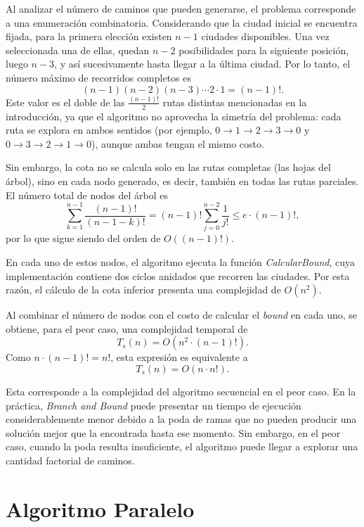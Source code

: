 \documentclass[12pt,a4paper]{article}
\begin{document}
Al analizar el número de caminos que pueden generarse, el problema corresponde a
una enumeración combinatoria. Considerando que la ciudad inicial se encuentra
fijada, para la primera elección existen $n-1$ ciudades disponibles. Una vez
seleccionada una de ellas, quedan $n-2$ posibilidades para la siguiente posición,
luego $n-3$, y así sucesivamente hasta llegar a la última ciudad. Por lo tanto, el
número máximo de recorridos completos es
\[
(n-1)(n-2)(n-3)\cdots 2 \cdot 1 = (n-1)!.
\]
Este valor es el doble de las $\frac{(n-1)!}{2}$ rutas distintas mencionadas en la
introducción, ya que el algoritmo no aprovecha la simetría del problema: cada ruta
se explora en ambos sentidos (por ejemplo, $0 \to 1 \to 2 \to 3 \to 0$ y
$0 \to 3 \to 2 \to 1 \to 0$), aunque ambas tengan el mismo costo.

Sin embargo, la cota no se calcula solo en las rutas completas (las hojas del
árbol), sino en cada nodo generado, es decir, también en todas las rutas
parciales. El número total de nodos del árbol es
\[
\sum_{k=1}^{n-1} \frac{(n-1)!}{(n-1-k)!}
= (n-1)! \sum_{j=0}^{n-2} \frac{1}{j!}
\leq e \cdot (n-1)!,
\]
por lo que sigue siendo del orden de $O\left((n-1)!\right)$.

En cada uno de estos nodos, el algoritmo ejecuta la función
\textit{CalcularBound}, cuya implementación contiene dos ciclos anidados que
recorren las ciudades. Por esta razón, el cálculo de la cota inferior presenta una
complejidad de $O(n^2)$.

Al combinar el número de nodos con el costo de calcular el \textit{bound} en cada
uno, se obtiene, para el peor caso, una complejidad temporal de
\[
T_s(n) = O\left(n^2 \cdot (n-1)!\right).
\]
Como $n \cdot (n-1)! = n!$, esta expresión es equivalente a
\[
\boxed{T_s(n) = O(n \cdot n!)}.
\]

Esta corresponde a la complejidad del algoritmo secuencial en el peor caso. En la
práctica, \textit{Branch and Bound} puede presentar un tiempo de ejecución
considerablemente menor debido a la poda de ramas que no pueden producir una
solución mejor que la encontrada hasta ese momento. Sin embargo, en el peor caso,
cuando la poda resulta insuficiente, el algoritmo puede llegar a explorar una
cantidad factorial de caminos.




\section{Algoritmo Paralelo}
\label{sec:paralelo}
\end{document}

